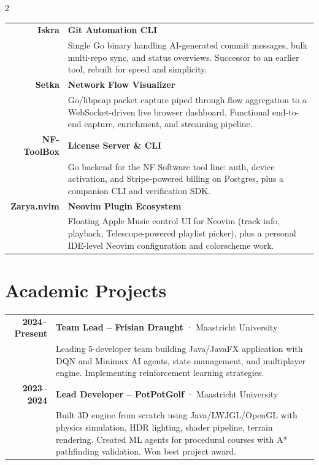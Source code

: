 \documentclass[lighthipster]{simplehipstercv}
\begin{document}
\begin{paracol}{2}
\begin{tabular}{r| p{}}
    \textbf{Iskra} & \textbf{Git Automation CLI} \\
    & {\footnotesize Single Go binary handling AI-generated commit messages, bulk multi-repo sync, and status overviews. Successor to an earlier tool, rebuilt for speed and simplicity.} \\[0.8em]

    \textbf{Setka} & \textbf{Network Flow Visualizer} \\
    & {\footnotesize Go/libpcap packet capture piped through flow aggregation to a WebSocket-driven live browser dashboard. Functional end-to-end capture, enrichment, and streaming pipeline.} \\[0.8em]

    \textbf{NF-ToolBox} & \textbf{License Server \& CLI} \\
    & {\footnotesize Go backend for the NF Software tool line: auth, device activation, and Stripe-powered billing on Postgres, plus a companion CLI and verification SDK.} \\[0.8em]

    \textbf{Zarya.nvim} & \textbf{Neovim Plugin Ecosystem} \\
    & {\footnotesize Floating Apple Music control UI for Neovim (track info, playback, Telescope-powered playlist picker), plus a personal IDE-level Neovim configuration and colorscheme work.} \\
\end{tabular}

\vspace{1.2em}

\section*{Academic Projects}

\begin{tabular}{r| p{}}
    \textbf{2024--Present} & \textbf{Team Lead -- Frisian Draught} · Maastricht University \\
    & {\footnotesize Leading 5-developer team building Java/JavaFX application with DQN and Minimax AI agents, state management, and multiplayer engine. Implementing reinforcement learning strategies.} \\[0.7em]

    \textbf{2023--2024} & \textbf{Lead Developer -- PotPotGolf} · Maastricht University \\
    & {\footnotesize Built 3D engine from scratch using Java/LWJGL/OpenGL with physics simulation, HDR lighting, shader pipeline, terrain rendering. Created ML agents for procedural courses with A* pathfinding validation. Won best project award.} \\
\end{tabular}


\end{paracol}
\end{document}
